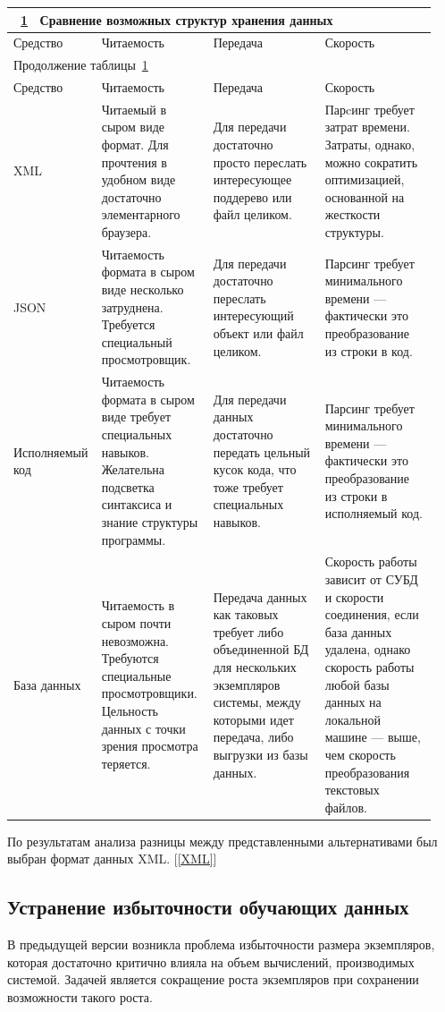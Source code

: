 \documentclass[utf8,usehyperref,14pt]{G7-32}
\begin{document}
\begin{longtable}{|p{0.16\linewidth}|p{0.26\linewidth}|p{0.26\linewidth}|p{0.26\linewidth}|}
\multicolumn{4}{l}{\tablename~\ref{T:Ta} ~Сравнение возможных структур хранения данных \label{T:Ta}}\\
\hline
Средство & Читаемость & Передача & Скорость \\
\hline
\endfirsthead
\multicolumn{4}{l}{Продолжение таблицы~\ref{T:Ta}}\\
\hline
Средство & Читаемость & Передача & Скорость \\
\hline
\endhead\small
XML & Читаемый в сыром виде формат. Для прочтения в удобном виде достаточно элементарного браузера. & Для передачи достаточно просто переслать интересующее поддерево или файл целиком. & Парcинг требует затрат времени. Затраты, однако, можно сократить оптимизацией, основанной на жесткости структуры.   \\ \hline
JSON & Читаемость формата в сыром виде несколько затруднена. Требуется специальный просмотровщик. & Для передачи достаточно переслать интересующий объект или файл целиком. & Парсинг требует минимального времени --- фактически это преобразование из строки в код. \\ \hline
Исполняемый код & Читаемость формата в сыром виде требует специальных навыков. Желательна подсветка синтаксиса и знание структуры программы. & Для передачи данных достаточно передать цельный кусок кода, что тоже требует специальных навыков. & Парсинг требует минимального времени --- фактически это преобразование из строки в исполняемый код. \\ \hline
База данных &
Читаемость в сыром почти невозможна. Требуются специальные просмотровщики. Цельность данных с точки зрения просмотра теряется. &
Передача данных как таковых требует либо объединенной БД для нескольких экземпляров системы, между которыми идет передача, либо выгрузки из базы данных. &
Скорость работы зависит от СУБД и скорости соединения, если база данных удалена, однако скорость работы любой базы данных на локальной машине --- выше, чем скорость преобразования текстовых файлов. \\ 
\hline
\end{longtable}
\normalsize
По результатам анализа разницы между представленными альтернативами был выбран формат данных XML. [\ref{XML}]

\subsection{Устранение избыточности обучающих данных}
В предыдущей версии возникла проблема избыточности размера экземпляров, которая достаточно критично влияла на объем  вычислений, производимых системой. Задачей является сокращение роста экземпляров при сохранении возможности такого роста.
\end{document}
